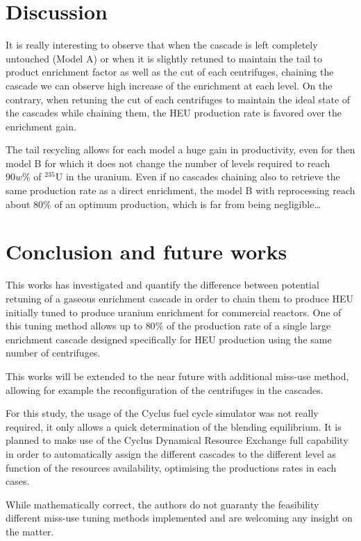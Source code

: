\section{Discussion}

It is really interesting to observe that when the cascade is left completely
untouched (Model A) or when it is slightly retuned to maintain the tail to
product enrichment factor as well as the cut of each centrifuges, chaining the
cascade we can observe high increase of the enrichment at each level.  On the
contrary, when retuning the cut of each centrifuges to maintain the ideal state
of the cascades while chaining them, the \gls{HEU} production rate is favored
over the enrichment gain.

The tail recycling allows for each model a huge gain in productivity, even for
then model B for which it does not change the number of levels required to reach
$90w\%$ of $^{235}$U in the uranium. Even if no cascades chaining also to
retrieve the same production rate as a direct enrichment, the model B with
reprocessing reach about $80\%$ of an optimum production, which is far from
being negligible\ldots


\section{Conclusion and future works}

This works has investigated and quantify the difference between potential
retuning of a gaseous enrichment cascade in order to chain them to produce
\gls{HEU} initially tuned to produce uranium enrichment for commercial reactors.
One of this tuning method allows up to $80\%$ of the production rate of a single
large enrichment cascade designed specifically for \gls{HEU} production using
the same number of centrifuges.

This works will be extended to the near future with additional miss-use method,
allowing for example the reconfiguration of the centrifuges in the cascades.

For this study, the usage of the Cyclus fuel cycle simulator was not really
required, it only allows a quick determination of the blending equilibrium. It
is planned to make use of the Cyclus Dynamical Resource Exchange full capability
in order to automatically assign the different cascades to the different level
as function of the resources availability, optimising the productions rates in
each cases.

While mathematically correct, the authors do not guaranty the feasibility
different miss-use tuning methods implemented and are welcoming any insight on
the matter.


